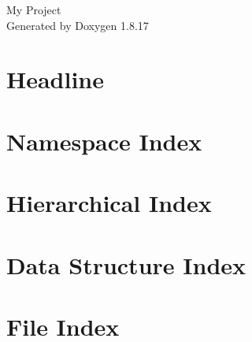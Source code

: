 \let\mypdfximage\pdfximage\def\pdfximage{\immediate\mypdfximage}\documentclass[twoside]{book}
\newcommand{\+}{\discretionary{\mbox{\scriptsize$\hookleftarrow$}}{}{}}
\newcommand{\clearemptydoublepage}{%
  \newpage{\pagestyle{empty}\cleardoublepage}%
}
\begin{document}
\hypersetup{pageanchor=false,
             bookmarksnumbered=true,
             pdfencoding=unicode
            }
\begin{titlepage}
\vspace*{7cm}
\begin{center}%
{\Large My Project }\\
\vspace*{1cm}
{\large Generated by Doxygen 1.8.17}\\
\end{center}
\end{titlepage}
\clearemptydoublepage
{}
\tableofcontents
\clearemptydoublepage
{}
\hypersetup{pageanchor=true}

\chapter{Headline}
\label{md_docs_README}

\chapter{Namespace Index}

\chapter{Hierarchical Index}

\chapter{Data Structure Index}

\chapter{File Index}

\end{document}
